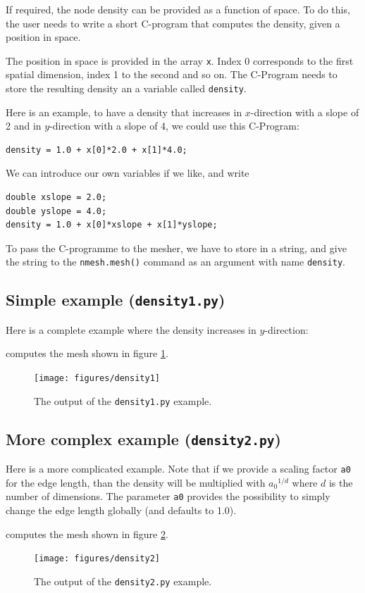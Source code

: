 \documentclass[10pt,a4paper]{book}
\newcommand{\py}[1]{\texttt{\color{blue}#1}}
\begin{document}
If required, the node density can be provided as a function of space.
To do this, the user needs to write a short C-program that computes
the density, given a position in space.

The position in space is provided in the array \py{x}. Index 0
corresponds to the first spatial dimension, index 1 to the second and
so on. The C-Program needs to store the resulting density an a
variable called \py{density}. 

Here is an example, to have a density that increases in $x$-direction with a slope of 2 and in $y$-direction with a slope of 4, we could use this C-Program:
\begin{lstlisting}
density = 1.0 + x[0]*2.0 + x[1]*4.0;
\end{lstlisting}
We can introduce our own variables if we like, and write
\begin{lstlisting}
double xslope = 2.0;
double yslope = 4.0;
density = 1.0 + x[0]*xslope + x[1]*yslope;
\end{lstlisting}

To pass the C-programme to the mesher, we have to store in a string, and give the string to the \py{nmesh.mesh()} command as an argument with name \py{density}. 

\subsection{Simple example (\texttt{density1.py})}

Here is a complete example where the density increases in $y$-direction:

computes the mesh shown in figure \ref{fig:density1}.
\begin{figure}[tbhp]
\centerline{\texttt{[image: figures/density1]}}
\caption{\label{fig:density1} The output of the \py{density1.py} example.}
\end{figure}

\subsection{More complex example (\texttt{density2.py})}

Here is a more complicated example. Note that if we provide a scaling factor \py{a0} for the edge length, than the density will be multiplied with ${a_0}^{1/d}$ where $d$ is the number of dimensions. The parameter \py{a0} provides the possibility to simply change the edge length globally (and defaults to 1.0).

computes the mesh shown in figure \ref{fig:density2}.
\begin{figure}[tbhp]
\centerline{\texttt{[image: figures/density2]}}
\caption{\label{fig:density2} The output of the \py{density2.py} example.}
\end{figure}
\end{document}
